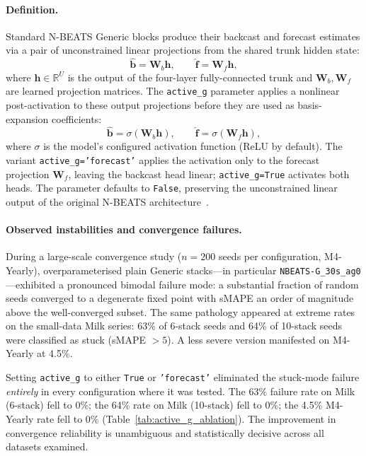 \documentclass{article}
\begin{document}
\paragraph{Definition.}
Standard N-BEATS Generic blocks produce their backcast and forecast estimates via a pair of unconstrained linear projections from the shared trunk hidden state:
\[
  \hat{\mathbf{b}} = \mathbf{W}_b \mathbf{h}, \qquad \hat{\mathbf{f}} = \mathbf{W}_f \mathbf{h},
\]
where $\mathbf{h} \in \mathbb{R}^U$ is the output of the four-layer fully-connected trunk and $\mathbf{W}_b, \mathbf{W}_f$ are learned projection matrices. The \texttt{active\_g} parameter applies a nonlinear post-activation to these output projections before they are used as basis-expansion coefficients:
\[
  \hat{\mathbf{b}} = \sigma(\mathbf{W}_b \mathbf{h}), \qquad \hat{\mathbf{f}} = \sigma(\mathbf{W}_f \mathbf{h}),
\]
where $\sigma$ is the model's configured activation function (ReLU by default). The variant \texttt{active\_g='forecast'} applies the activation only to the forecast projection $\mathbf{W}_f$, leaving the backcast head linear; \texttt{active\_g=True} activates both heads. The parameter defaults to \texttt{False}, preserving the unconstrained linear output of the original N-BEATS architecture~\citep{oreshkin2020nbeats}.

\paragraph{Observed instabilities and convergence failures.}
During a large-scale convergence study ($n = 200$ seeds per configuration, M4-Yearly), overparameterised plain Generic stacks---in particular \texttt{NBEATS-G\_30s\_ag0}---exhibited a pronounced bimodal failure mode: a substantial fraction of random seeds converged to a degenerate fixed point with sMAPE an order of magnitude above the well-converged subset. The same pathology appeared at extreme rates on the small-data Milk series: 63\% of 6-stack seeds and 64\% of 10-stack seeds were classified as stuck (sMAPE $> 5$). A less severe version manifested on M4-Yearly at 4.5\%.

Setting \texttt{active\_g} to either \texttt{True} or \texttt{'forecast'} eliminated the stuck-mode failure \emph{entirely} in every configuration where it was tested. The 63\% failure rate on Milk (6-stack) fell to 0\%; the 64\% rate on Milk (10-stack) fell to 0\%; the 4.5\% M4-Yearly rate fell to 0\% (Table~\ref{tab:active_g_ablation}). The improvement in convergence reliability is unambiguous and statistically decisive across all datasets examined.
\end{document}
